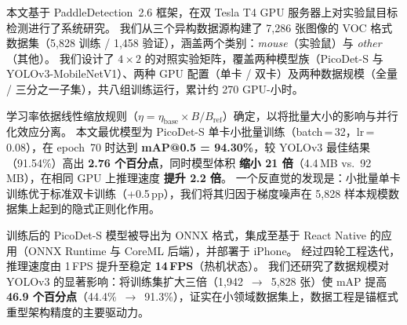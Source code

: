 本文基于 PaddleDetection~2.6 框架，在双 Tesla T4 GPU 服务器上对实验鼠目标检测进行了系统研究。
我们从三个异构数据源构建了 7,286 张图像的 VOC 格式数据集（5,828 训练 / 1,458 验证），涵盖两个类别：\textit{mouse}（实验鼠）与 \textit{other}（其他）。
我们设计了 $4\!\times\!2$ 的对照实验矩阵，覆盖两种模型族（PicoDet-S 与 YOLOv3-MobileNetV1）、两种 GPU 配置（单卡 / 双卡）及两种数据规模（全量 / 三分之一子集），共八组训练运行，累计约 270 GPU-小时。

学习率依据线性缩放规则（$\eta = \eta_\text{base}\!\times\! B/B_\text{ref}$）确定，以将批量大小的影响与并行化效应分离。
本文最优模型为 PicoDet-S 单卡小批量训练（batch\,=\,32，lr\,=\,0.08），在 epoch~70 时达到 \textbf{mAP@0.5 = 94.30\%}，较 YOLOv3 最佳结果（91.54\%）高出 \textbf{2.76 个百分点}，同时模型体积 \textbf{缩小 21 倍}（4.4\,MB vs.\ 92\,MB），在相同 GPU 上推理速度 \textbf{提升 2.2 倍}。
一个反直觉的发现是：小批量单卡训练优于标准双卡训练（+0.5\,pp），我们将其归因于梯度噪声在 5,828 样本规模数据集上起到的隐式正则化作用。

训练后的 PicoDet-S 模型被导出为 ONNX 格式，集成至基于 React Native 的应用（ONNX Runtime 与 CoreML 后端），并部署于 iPhone。
经过四轮工程迭代，推理速度由 1\,FPS 提升至稳定 \textbf{14\,FPS}（热机状态）。
我们还研究了数据规模对 YOLOv3 的显著影响：将训练集扩大三倍（1,942~$\to$~5,828 张）使 mAP 提高 \textbf{46.9 个百分点}（44.4\%~$\to$~91.3\%），证实在小领域数据集上，数据工程是锚框式重型架构精度的主要驱动力。
